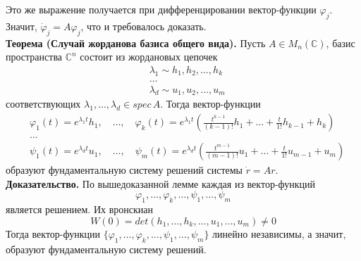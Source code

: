 Это же выражение получается при дифференцировании вектор-функции $\varphi_j$. Значит, $\dot{\varphi}_j = A\varphi_j$, что и требовалось доказать.\\

\noindent \textbf{Теорема (Случай жорданова базиса общего вида).} Пусть $A \in M_n(\mathbb{C})$, базис пространства $\mathbb{C}^n$ состоит из жордановых цепочек
\begin{equation*}
    \begin{aligned}
         & \lambda_1 \sim h_1, h_2, \ldots, h_k \\
         & \ldots                               \\
         & \lambda_d \sim u_1, u_2, \ldots, u_m
    \end{aligned}
\end{equation*}
соответствующих $\lambda_1, \ldots, \lambda_d \in spec\, A$. Тогда вектор-функции
\begin{equation*}
    \begin{aligned}
         & \varphi_1(t) = e^{\lambda_1 t}h_1, \quad \ldots, \quad \varphi_k(t) = e^{\lambda_1 t}\left(\frac{t^{k-1}}{(k-1)!}h_1 + \ldots + \frac{t}{1!}h_{k-1} + h_k \right) \\
         & \ldots                                                                                                                                                            \\
         & \psi_1(t) = e^{\lambda_d t}u_1, \quad \ldots, \quad \psi_m(t) = e^{\lambda_d t}\left(\frac{t^{m-1}}{(m-1)!}u_1 + \ldots + \frac{t}{1!}u_{m-1} + u_m \right)
    \end{aligned}
\end{equation*}
образуют фундаментальную систему решений системы $\dot{r} = Ar$.\\

\noindent \textbf{Доказательство.} По вышедоказанной лемме каждая из вектор-функций
\begin{equation*}
    \varphi_1, \ldots, \varphi_k, \ldots, \psi_1, \ldots, \psi_m
\end{equation*}
является решением. Их вронскиан
\begin{equation*}
    W(0) = det(h_1, \ldots, h_k, \ldots, u_1, \ldots, u_m) \neq 0
\end{equation*}
Тогда вектор-функции $\{\varphi_1, \ldots, \varphi_k, \ldots, \psi_1, \ldots, \psi_m\}$ линейно независимы, а значит, образуют фундаментальную систему решений.\\

